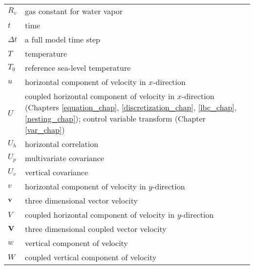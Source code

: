 \begin{tabular}{ l p{5.5in} }
$R_v$          & gas constant for water vapor \\
$t$            & time \\
$\Delta t$     & a full model time step \\
$T$            & temperature \\
$T_0$          & reference sea-level temperature \\
$u$            & horizontal component of velocity in $x$-direction \\
$U$            & coupled horizontal component of velocity in $x$-direction (Chapters \ref{equation_chap}, \ref{discretization_chap}, \ref{lbc_chap}, \ref{nesting_chap}); control variable transform (Chapter \ref{var_chap}) \\
$U_h$          & horizontal correlation \\
$U_p$          & multivariate covariance \\
$U_v$          & vertical covariance \\
$v$            & horizontal component of velocity in $y$-direction \\
$\bf v$        & three dimensional vector velocity \\
$V$            & coupled horizontal component of velocity in $y$-direction \\
$\bf V$        & three dimensional coupled vector velocity \\
$w$            & vertical component of velocity \\
$W$            & coupled vertical component of velocity \\

\end{tabular}


